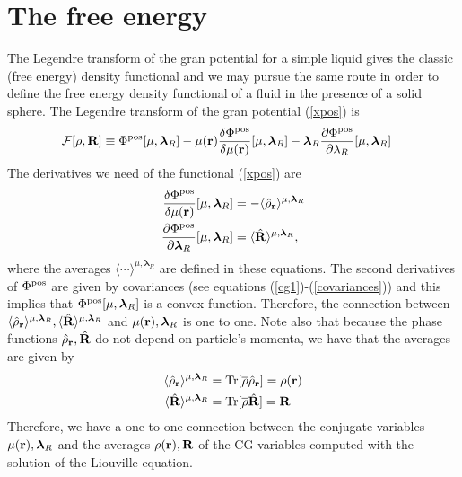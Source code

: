 \documentclass[b5paper,openright,10pt]{book}
\begin{document}
\section{The free energy}
The Legendre transform of the gran potential for a simple liquid gives the classic (free energy) density functional and we may pursue the same route in order to define the free energy density functional of a fluid in the presence of a solid sphere. The Legendre transform of the gran potential (\ref{xpos}) is
\begin{align}
  {\cal F}[\rho,{\bf R}]&\equiv  \Phi^{\rm pos}[\mu,\boldsymbol{\lambda}_R]
-\mu({\bf r})\frac{\delta\Phi^{\rm pos}}{\delta\mu({\bf r})}[\mu,\boldsymbol{\lambda}_R] 
-\boldsymbol{\lambda}_R\frac{\partial \Phi^{\rm pos}}{\partial \lambda_R}[\mu,\boldsymbol{\lambda}_R] 
\label{legPrev}
\end{align}
The derivatives we need of the functional (\ref{xpos}) are
\begin{align}
 \frac{\delta \Phi^{\rm pos}}{\delta \mu({\bf r})}[\mu,\boldsymbol{\lambda}_R]&=-
\langle \hat{\rho}_{\bf r}\rangle^{\mu,\boldsymbol{\lambda}_R}
\nonumber\\
  \frac{\partial \Phi^{\rm pos}}{\partial \boldsymbol{\lambda}_R}[\mu,\boldsymbol{\lambda}_R]&=
\langle \hat{\bf R}\rangle^{\mu,\boldsymbol{\lambda}_R},
\end{align}
where               the                averages               $\langle
\cdots\rangle^{\mu,\boldsymbol{\lambda}_R}$   are  defined   in  these
equations.  The second  derivatives of $ \Phi^{\rm pos}$  are given by
covariances  (see   equations  (\ref{cg1})-(\ref{covariances}))   and  this
implies that $\Phi^{\rm  pos}[\mu,\boldsymbol{\lambda}_R]$ is a convex
function.  Therefore, the  connection between $\langle \hat{\rho}_{\bf
  r}\rangle^{\mu,\boldsymbol{\lambda}_R},       \langle       \hat{\bf
  R}\rangle^{\mu,\boldsymbol{\lambda}_R}$         and        $\mu({\bf
  r}),\boldsymbol{\lambda}_R$ is  one to  one. Note also  that because
the phase functions  $ \hat{\rho}_{\bf r}, \hat{\bf R}$  do not depend
on particle's momenta, we have that the averages are given by
\begin{align}
  \langle \hat{\rho}_{\bf r}\rangle^{\mu,\boldsymbol{\lambda}_R} &={\rm Tr}[\overline{\rho}\hat{\rho}_{\bf r}]=\rho({\bf r})
\nonumber\\
  \langle \hat{\bf R}\rangle^{\mu,\boldsymbol{\lambda}_R} &={\rm Tr}[\overline{\rho}\hat{\bf R}]={\bf R}
\end{align}
Therefore,  we have  a one  to  one connection  between the  conjugate
variables  $\mu({\bf  r}),\boldsymbol{\lambda}_R$   and  the  averages
$\rho({\bf  r}),{\bf  R}$  of  the  CG  variables computed with the solution of the Liouville equation. 
\end{document}
